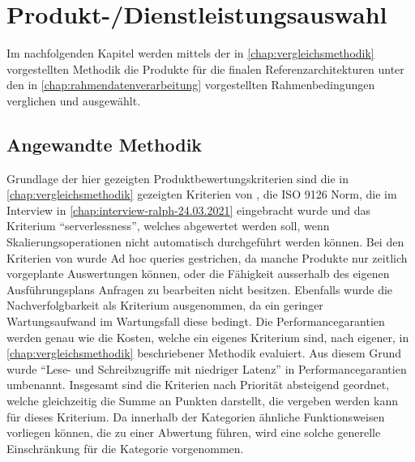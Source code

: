 \chapter{Produkt-/Dienstleistungsauswahl}
Im nachfolgenden Kapitel werden mittels der in \autoref{chap:vergleichsmethodik} vorgestellten Methodik die Produkte für die finalen Referenzarchitekturen unter den in \autoref{chap:rahmendatenverarbeitung} vorgestellten Rahmenbedingungen verglichen und ausgewählt.

\section{Angewandte Methodik}

Grundlage der hier gezeigten Produktbewertungskriterien sind die in \autoref{chap:vergleichsmethodik} gezeigten Kriterien von \citeauthor{Marz.2015}, die ISO 9126 Norm, die im Interview in \autoref{chap:interview-ralph-24.03.2021} eingebracht wurde und das Kriterium \enquote{serverlessness}, welches abgewertet werden soll, wenn Skalierungsoperationen nicht automatisch durchgeführt werden können. Bei den Kriterien von \citeauthor{Marz.2015} wurde Ad hoc queries gestrichen, da manche Produkte nur zeitlich vorgeplante Auswertungen können, oder die Fähigkeit ausserhalb des eigenen Ausführungsplans Anfragen zu bearbeiten nicht besitzen. Ebenfalls wurde die Nachverfolgbarkeit als Kriterium ausgenommen, da ein geringer Wartungsaufwand im Wartungsfall diese bedingt. Die Performancegarantien werden genau wie die Kosten, welche ein eigenes Kriterium sind, nach eigener, in \autoref{chap:vergleichsmethodik} beschriebener Methodik evaluiert. Aus diesem Grund wurde \enquote{Lese- und Schreibzugriffe mit niedriger Latenz} in Performancegarantien umbenannt. Insgesamt sind die Kriterien nach Priorität absteigend geordnet, welche gleichzeitig die Summe an Punkten darstellt, die vergeben werden kann für dieses Kriterium. Da innerhalb der Kategorien ähnliche Funktionsweisen vorliegen können, die zu einer Abwertung führen, wird eine solche generelle Einschränkung für die Kategorie vorgenommen.

